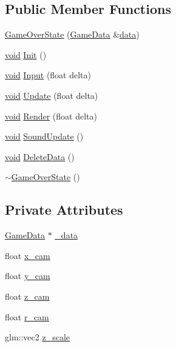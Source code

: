 \subsection*{Public Member Functions}
\begin{DoxyCompactItemize}
\item 
\hyperlink{classGameOverState_aa96fa2d6ec8131c6295ef8ae189b5dc1}{Game\+Over\+State} (\hyperlink{structGameData}{Game\+Data} \&\hyperlink{imgui__impl__opengl3__loader_8h_abd87654504355b4c1bb002dcb1d4d16a}{data})
\item 
\hyperlink{imgui__impl__opengl3__loader_8h_ac668e7cffd9e2e9cfee428b9b2f34fa7}{void} \hyperlink{classGameOverState_aa3d4f165ff735552f16132e929d369c2}{Init} ()
\item 
\hyperlink{imgui__impl__opengl3__loader_8h_ac668e7cffd9e2e9cfee428b9b2f34fa7}{void} \hyperlink{classGameOverState_adb4be2a5c6292d020999c2da9588ebfc}{Input} (float delta)
\item 
\hyperlink{imgui__impl__opengl3__loader_8h_ac668e7cffd9e2e9cfee428b9b2f34fa7}{void} \hyperlink{classGameOverState_a4dc49d576a9435531f502660119800a9}{Update} (float delta)
\item 
\hyperlink{imgui__impl__opengl3__loader_8h_ac668e7cffd9e2e9cfee428b9b2f34fa7}{void} \hyperlink{classGameOverState_ac9c9ef71b0a12940ac5caa7763f23fdc}{Render} (float delta)
\item 
\hyperlink{imgui__impl__opengl3__loader_8h_ac668e7cffd9e2e9cfee428b9b2f34fa7}{void} \hyperlink{classGameOverState_ab46f47037abd1eeabdbff49f8dfb802b}{Sound\+Update} ()
\item 
\hyperlink{imgui__impl__opengl3__loader_8h_ac668e7cffd9e2e9cfee428b9b2f34fa7}{void} \hyperlink{classGameOverState_afb6fa68ff0c5e4f83725de8059c4f7c8}{Delete\+Data} ()
\item 
\hyperlink{classGameOverState_a6450295ac3a2d64a19bdfe1ad70aacad}{$\sim$\+Game\+Over\+State} ()
\end{DoxyCompactItemize}
\subsection*{Private Attributes}
\begin{DoxyCompactItemize}
\item 
\hyperlink{structGameData}{Game\+Data} $\ast$ \hyperlink{classGameOverState_a1df24a620531ad2a7ebfca275725c2ea}{\+\_\+data}
\item 
float \hyperlink{classGameOverState_a1069a15743773be39ec300b0ed826495}{x\+\_\+cam}
\item 
float \hyperlink{classGameOverState_a1e25279faab5b2551102ef39aa815e2f}{y\+\_\+cam}
\item 
float \hyperlink{classGameOverState_a81afb5a04a07d3697edfc66063154362}{z\+\_\+cam}
\item 
float \hyperlink{classGameOverState_a53e39df9000ba7f88cd8d3beb151e86c}{r\+\_\+cam}
\item 
glm\+::vec2 \hyperlink{classGameOverState_a9b5f78804f2ec06ade38c0e69560f9b4}{z\+\_\+scale}
\end{DoxyCompactItemize}


